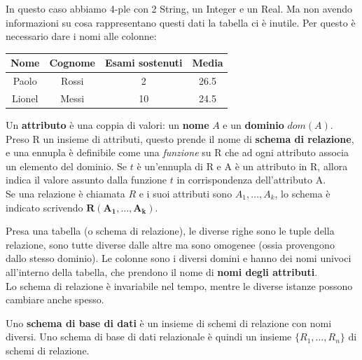 \documentclass[11pt, a4paper, titlepage, oneside]{scrbook}
\begin{document}
In questo caso abbiamo 4-ple con 2 String, un Integer e un Real. Ma non avendo informazioni su cosa rappresentano questi dati la tabella ci è inutile. Per questo è necessario dare i nomi alle colonne:

\begin{center}
\begin{tabular}{|c|c|c|c|}
\hline
\textbf{Nome} & \textbf{Cognome} & \textbf{Esami sostenuti} & \textbf{Media} \\
\hline
Paolo & Rossi & 2 & 26.5 \\
\hline
Lionel & Messi & 10 & 24.5 \\
\hline
\end{tabular}
\end{center}

\begin{Definizione}[Attributi]
\label{def-attributo-2}
Un \textbf{attributo} è una coppia di valori: un \textbf{nome} $A$ e un \textbf{dominio} $dom(A)$. Preso R un insieme di attributi, questo prende il nome di \textbf{schema di relazione}, e una ennupla è definibile come una \textit{funzione} su R che ad ogni attributo associa un elemento del dominio. Se $t$ è un'ennupla di R e A è un attributo in R, allora  indica il valore assunto dalla funzione $t$ in corrispondenza dell'attributo A. \\
\NB Se una relazione è chiamata $R$ e i suoi attributi sono $A_1, \ldots, A_k$, lo schema è indicato scrivendo $\bm{R(A_1, \ldots, A_k)}$.
\end{Definizione}

Presa una tabella (o schema di relazione), le diverse righe sono le tuple della relazione, sono tutte diverse dalle altre ma sono omogenee (ossia provengono dallo stesso dominio). Le colonne sono i diversi domini e hanno dei nomi univoci all'interno della tabella, che prendono il nome di \textbf{nomi degli attributi}. \\
Lo schema di relazione è invariabile nel tempo, mentre le diverse istanze possono cambiare anche spesso. 

\begin{Definizione}
\label{def-schema-base-di-dati}
Uno \textbf{schema di base di dati} è un insieme di schemi di relazione con nomi diversi. Uno schema di base di dati relazionale è quindi un insieme $\{R_1, \ldots, R_n\}$ di schemi di relazione.
\end{Definizione}
\end{document}
